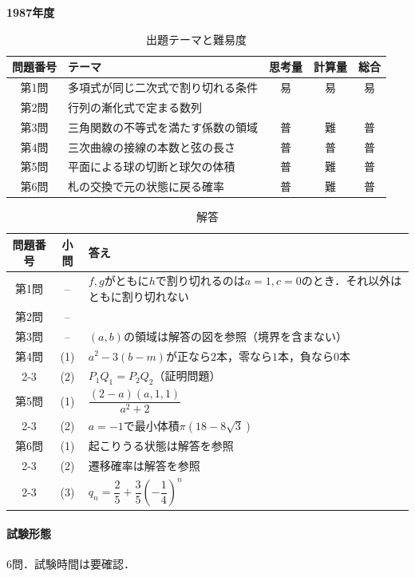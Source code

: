 \documentclass[../../main.tex]{subfiles}
\begin{document}
\begin{center}
  {\fontsize{48pt}{58pt}\selectfont \textbf{1987}\normalsize\textbf{年度}}
\end{center}

\begin{table}[htb]
  \centering
  \caption{出題テーマと難易度}
  \begin{tabular}{|c|p{6.2cm}|c|c|c|}
    \hline
    \textbf{問題番号} & \textbf{テーマ} & \textbf{思考量} & \textbf{計算量} & \textbf{総合} \\
    \hline
    第1問 & 多項式が同じ二次式で割り切れる条件 & 易 & 易 & 易 \\
    \hline
    第2問 & 行列の漸化式で定まる数列 &  &  &  \\
    \hline
    第3問 & 三角関数の不等式を満たす係数の領域 & 普 & 難 & 普 \\
    \hline
    第4問 & 三次曲線の接線の本数と弦の長さ & 普 & 普 & 普 \\
    \hline
    第5問 & 平面による球の切断と球欠の体積 & 普 & 難 & 普 \\
    \hline
    第6問 & 札の交換で元の状態に戻る確率 & 普 & 難 & 普 \\
    \hline
  \end{tabular}
\end{table}

\begin{table}[htb]
  \centering
  \caption{解答}
  \renewcommand{\arraystretch}{1.4}
  \begin{tabular}{|c|c|p{9cm}|}
    \hline
    \textbf{問題番号} & \textbf{小問} & \textbf{答え} \\
    \hline
    第1問 & -- & $f,g$がともに$h$で割り切れるのは$a=1,c=0$のとき．それ以外はともに割り切れない \\
    \hline
    第2問 & -- &  \\
    \hline
    第3問 & -- & $(a,b)$の領域は解答の図を参照（境界を含まない） \\
    \hline
    第4問 & (1) & $a^2-3(b-m)$が正なら$2$本，零なら$1$本，負なら$0$本 \\
    \cline{2-3}
    & (2) & $P_1Q_1=P_2Q_2$（証明問題） \\
    \hline
    第5問 & (1) & $\dfrac{(2-a)(a,1,1)}{a^2+2}$ \\
    \cline{2-3}
    & (2) & $a=-1$で最小体積$\pi(18-8\sqrt{3})$ \\
    \hline
    第6問 & (1) & 起こりうる状態は解答を参照 \\
    \cline{2-3}
    & (2) & 遷移確率は解答を参照 \\
    \cline{2-3}
    & (3) & $q_n=\dfrac{2}{5}+\dfrac{3}{5}(-\dfrac{1}{4})^n$ \\
    \hline
  \end{tabular}
\end{table}

\paragraph{試験形態}
6問．試験時間は要確認．
\end{document}
